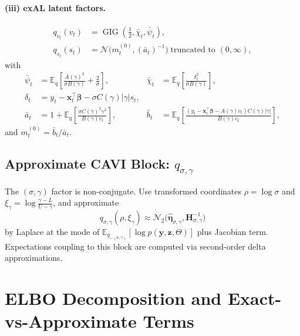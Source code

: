 \documentclass[11pt]{article}
\newcommand{\E}{\mathbb{E}}
\newcommand{\N}{\mathcal{N}}
\newcommand{\vect}[1]{\bm{#1}}
\newcommand{\mat}[1]{\bm{#1}}
\DeclareMathOperator{\GIG}{GIG}
\begin{document}
\paragraph{(iii) exAL latent factors.}
\begin{align}
  q_{v_t}(v_t)
  &= \GIG\!\left(\frac12,\bar\chi_t,\bar\psi_t\right),
  \label{eq:vb-vt}
  \\
  q_{s_t}(s_t)
  &= \N\!\big(m_t^{(0)},(\bar a_t)^{-1}\big)\;\text{truncated to }(0,\infty),
  \label{eq:vb-st}
\end{align}
with
\begin{align}
  \bar\psi_t &= \E_q\!\left[\frac{A(\gamma)^2}{\sigma B(\gamma)}+\frac{2}{\sigma}\right],
  &
  \bar\chi_t &= \E_q\!\left[\frac{\delta_t^2}{\sigma B(\gamma)}\right],
  \\
  \delta_t &= y_t-\vect{x}_t^\top\vect{\beta}-\sigma C(\gamma)|\gamma|s_t,
  \\
  \bar a_t &= 1+\E_q\!\left[\frac{\sigma C(\gamma)^2\gamma^2}{B(\gamma)v_t}\right],
  &
  \bar b_t &= \E_q\!\left[\frac{(y_t-\vect{x}_t^\top\vect{\beta}-A(\gamma)v_t)C(\gamma)|\gamma|}{B(\gamma)v_t}\right],
\end{align}
and $m_t^{(0)}=\bar b_t/\bar a_t$.

\subsection{Approximate CAVI Block: $q_{\sigma,\gamma}$}

The $(\sigma,\gamma)$ factor is non-conjugate.
Use transformed coordinates
$\rho=\log\sigma$ and $\xi_\gamma=\log\frac{\gamma-L}{U-\gamma}$,
and approximate
\begin{equation}
  q_{\sigma,\gamma}(\rho,\xi_\gamma)
  \approx
  \N_2\!\big(\hat{\vect\eta}_{\sigma,\gamma},\mat{H}_{\sigma,\gamma}^{-1}\big)
\end{equation}
by Laplace at the mode of
$\E_{q_{-(\sigma,\gamma)}}[\log p(\vect{y},\vect{z},\Theta)]$
plus Jacobian term.
Expectations coupling to this block are computed via second-order delta approximations.

\section{ELBO Decomposition and Exact-vs-Approximate Terms}
\label{sec:elbo}
\end{document}
